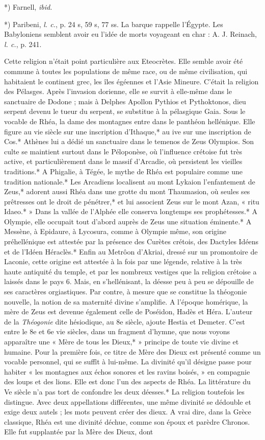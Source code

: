 \documentclass[a4paper, 11pt, oneside, polutonikogreek, french]{article}
\begin{document}
*) Farnell, \emph{ibid.}

*) Paribeni, \emph{l. c.}, p. 24 s, 59 s, 77 ss. La barque rappelle l'Égypte. Les Babyloniens semblent avoir eu l'idée de morts voyageant en char : A. J. Reinach, \emph{l. c.}, p. 241.

Cette religion n'était point particulière aux Eteocrètes. Elle semble avoir été commune à toutes les populations de même race, ou de même civilisation, qui habitaient le continent grec, les îles égéennes et l'Asie Mineure. C'était la religion des Pélasges. Après l'invasion dorienne, elle se survit à elle-même dans le sanctuaire de Dodone ; mais à Delphes Apollon Pythios et Pythoktonos, dieu serpent devenu le tueur du serpent, se substitue à la pélasgique Gaia. Sous le vocable de Rhéa, la dame des montagnes entre dans le panthéon hellénique. Elle figure au vie siècle sur une inscription d'Ithaque,* au ive sur une inscription de Cos.* Athènes lui a dédié un sanctuaire dans le temenos de Zeus Olympios. Son culte se maintient surtout dans le Péloponèse, où l'influence crétoise fut très active, et particulièrement dans le massif d'Arcadie, où persistent les vieilles traditions.* A Phigalie, à Tégée, le mythe de Rhéa est populaire comme une tradition nationale.* Les Arcadiens localisent au mont Lykaion l'enfantement de Zeus,* adorent aussi Rhéa dans une grotte du mont Thaumasion, où seules ses prêtresses ont le droit de pénétrer,* et lui associent Zeus sur le mont Azan, « ritu Idaeo.* » Dans la vallée de l'Alphée elle conserva longtemps ses prophétesses.* A Olympie, elle occupait tout d'abord auprès de Zeus une situation éminente.* A Messène, à Epidaure, à Lycosura, comme à Olympie même, son origine préhellénique est attestée par la présence des Curètes crétois, des Dactyles Idéens et de l'Idéen Héraclès.* Enfin au Metrôon d'Akriai, dressé sur un promontoire de Laconie, cette origine est attestée à la fois par une légende, relative à la très haute antiquité du temple, et par les nombreux vestiges que la religion crétoise a laissés dans le pays 6. Mais, en s'hellénisant, la déesse peu à peu se dépouille de ses caractères orgiastiques. Par contre, à mesure que se constitue la théogonie nouvelle, la notion de sa maternité divine s'amplifie. A l'époque homérique, la mère de Zeus est devenue également celle de Poséidon, Hadès et Héra. L'auteur de la \emph{Théogonie} dite hésiodique, au 8e siècle, ajoute Hestia et Demeter. C'est entre le 8e et 6e vie siècles, dans un fragment d'hymne, que nous voyons apparaître une « Mère de tous les Dieux,* » principe de toute vie divine et humaine. Pour la première fois, ce titre de Mère des Dieux est présenté comme un vocable personnel, qui se suffît à lui-même. La divinité qu'il désigne passe pour habiter « les montagnes aux échos sonores et les ravins boisés, » en compagnie des loups et des lions. Elle est donc l'un des aspects de Rhéa. La littérature du Ve siècle n'a pas tort de confondre les deux déesses.* La religion toutefois les distingue. Avec deux appellations différentes, une même divinité se dédouble et exige deux autels ; les mots peuvent créer des dieux. A vrai dire, dans la Grèce classique, Rhéa est une divinité déchue, comme son époux et parèdre Chronos. Elle fut supplantée par la Mère des Dieux, dont 
\end{document}
